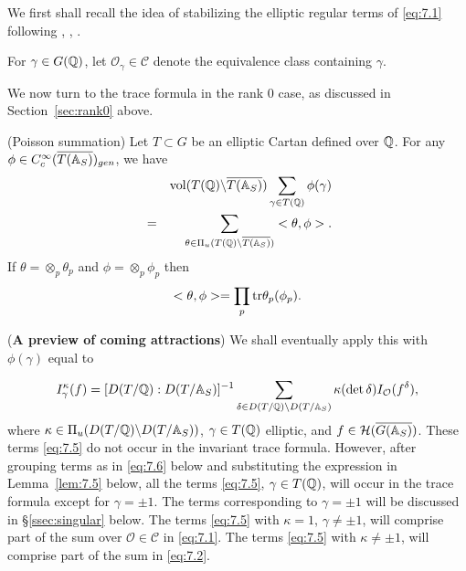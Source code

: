 We first shall recall the idea of stabilizing the elliptic regular terms of
\eqref{eq:7.1} following \cite{LL}, \cite{L3}, \cite{Ko1}.

For $\gamma \in G(\mathbb{Q} )$, let
${\mathcal{O}}_\gamma \in {\mathcal{C}}$ denote
the equivalence class containing $\gamma $. 

We now turn to the trace formula in the rank $0$ case, as discussed in
Section~\ref{sec:rank0} above.

\begin{proposition}\label{prop:7.2} (Poisson summation)
Let $T\subset G$ be an elliptic Cartan defined over $\mathbb{Q} $. For any
$\phi \in C_c^\infty (\overline{T(\mathbb{A} _S)})_{gen}$, we have 
\begin{eqnarray*}
&&{\mathrm{vol}}(T(\mathbb{Q} )\backslash \overline{T(\mathbb{A} _S)})
\sum_{\gamma \in T(\mathbb{Q} )}\phi (\gamma ) \\
&=&\sum_{\theta \in \Pi _u(T(\mathbb{Q} )\backslash \overline{T(\mathbb{A} _S)})}
<\theta,\phi>.
\end{eqnarray*}
If $\theta =\otimes _p\theta _p$ and $\phi=\otimes _p \phi_p$ then 
\[
<\theta ,\phi>=\prod_p{\rm tr}\theta _p(\phi_p).
\]
\end{proposition}

\begin{remark}\label{rem:7.3}
({\bf A preview of coming attractions})
We shall eventually apply this with $\phi (\gamma )$ equal to

\begin{equation}\label{eq:7.5}
I_\gamma ^\kappa (f)=
[D(T/\mathbb{Q} ): D(T/\mathbb{A} _S)]^{-1}
\sum_{\delta\in
D(T/\mathbb{Q} )\backslash D(T/\mathbb{A} _S)}
\kappa (\det \delta)I_{\mathcal{O}}(f^\delta),
\end{equation}
where $\kappa \in \Pi _u(D(T/\mathbb{Q} )\backslash D(T/\mathbb{A} _S))$,
$\gamma\in T(\mathbb{Q} )$ elliptic, and
$f\in {\mathcal H}(\overline{G(\mathbb{A} _S)})$.
These terms \eqref{eq:7.5} do not occur in the invariant trace formula.
However, after grouping terms as in \eqref{eq:7.6} below and substituting
the expression in Lemma~\ref{lem:7.5} below, all the terms \eqref{eq:7.5},
$\gamma\in T(\mathbb{Q} )$, will occur in the trace formula
except for $\gamma =\pm 1$. The terms corresponding to
$\gamma =\pm 1$ will be discussed in \S\ref{ssec:singular} below.
The terms \eqref{eq:7.5} with $\kappa = 1$, $\gamma\not= \pm 1$,
will comprise part of the sum over
${\mathcal{O}}\in {\mathcal{C}}$ in \eqref{eq:7.1}. The
terms \eqref{eq:7.5} with $\kappa \not= \pm 1$,
will comprise part of the sum in \eqref{eq:7.2}.  
\end{remark}

